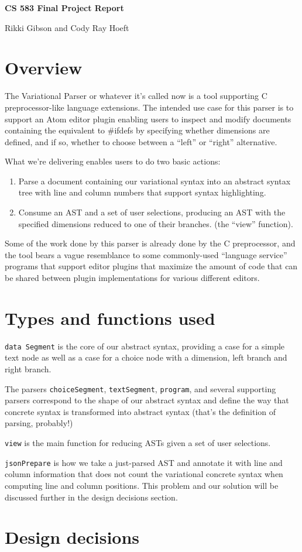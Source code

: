 \documentclass[11pt]{article}
\begin{document}
\Large\textbf{CS 583 Final Project Report}

\large{Rikki Gibson and Cody Ray Hoeft}
\normalsize
\section{Overview}
The Variational Parser or whatever it's called now is a tool supporting C preprocessor-like language extensions. The intended use case for this parser is to support an Atom editor plugin enabling users to inspect and modify documents containing the equivalent to \#ifdefs by specifying whether dimensions are defined, and if so, whether to choose between a ``left'' or ``right'' alternative.

What we're delivering enables users to do two basic actions:

\begin{enumerate} 
\item Parse a document containing our variational syntax into an abstract syntax tree with line and column numbers that support syntax highlighting.
\item Consume an AST and a set of user selections, producing an AST with the specified dimensions reduced to one of their branches. (the ``view'' function).
\end{enumerate}
Some of the work done by this parser is already done by the C preprocessor, and the tool bears a vague resemblance to some commonly-used ``language service'' programs that support editor plugins that maximize the amount of code that can be shared between plugin implementations for various different editors.

\section{Types and functions used}
\texttt{data Segment} is the core of our abstract syntax, providing a case for a simple text node as well as a case for a choice node with a dimension, left branch and right branch.

The parsers \texttt{choiceSegment}, \texttt{textSegment}, \texttt{program}, and several supporting parsers correspond to the shape of our abstract syntax and define the way that concrete syntax is transformed into abstract syntax (that's the definition of parsing, probably!)

\texttt{view} is the main function for reducing ASTs given a set of user selections.

\texttt{jsonPrepare} is how we take a just-parsed AST and annotate it with line and column information that does not count the variational concrete syntax when computing line and column positions. This problem and our solution will be discussed further in the design decisions section.

\section{Design decisions}
\end{document}
